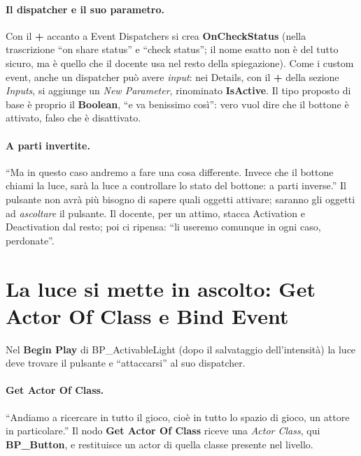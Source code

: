 \paragraph{Il dispatcher e il suo parametro.} Con il \textbf{+} accanto a Event
Dispatchers si crea \textbf{OnCheckStatus} (nella trascrizione ``on share status'' e
``check status''; il nome esatto non è del tutto sicuro, ma è quello che il docente usa
nel resto della spiegazione). Come i custom event, anche un dispatcher può avere
\emph{input}: nei Details, con il \textbf{+} della sezione \emph{Inputs}, si aggiunge un
\emph{New Parameter}, rinominato \textbf{IsActive}. Il tipo proposto di base è proprio
il \textbf{Boolean}, ``e va benissimo così'': vero vuol dire che il bottone è attivato,
falso che è disattivato.

\paragraph{A parti invertite.} ``Ma in questo caso andremo a fare una cosa differente.
Invece che il bottone chiami la luce, sarà la luce a controllare lo stato del bottone:
a parti inverse.'' Il pulsante non avrà più bisogno di sapere quali oggetti attivare;
saranno gli oggetti ad \emph{ascoltare} il pulsante. Il docente, per un attimo, stacca
Activation e Deactivation dal resto; poi ci ripensa: ``li useremo comunque in ogni
caso, perdonate''.

\section{La luce si mette in ascolto: Get Actor Of Class e Bind Event}
\label{ue7:sec:bind}

Nel \textbf{Begin Play} di BP\_ActivableLight (dopo il salvataggio dell'intensità) la luce
deve trovare il pulsante e ``attaccarsi'' al suo dispatcher.

\paragraph{Get Actor Of Class.} ``Andiamo a ricercare in tutto il gioco, cioè in tutto lo
spazio di gioco, un attore in particolare.'' Il nodo \textbf{Get Actor Of Class} riceve
una \emph{Actor Class}, qui \textbf{BP\_Button}, e restituisce un actor di quella classe
presente nel livello.

